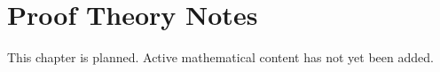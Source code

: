 
\section*{Proof Theory Notes}
This chapter is planned. Active mathematical content has not yet been added.
